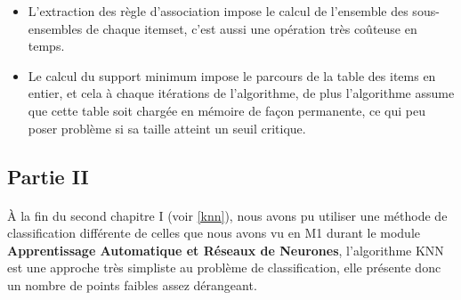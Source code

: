 \documentclass[12pt]{report}
\begin{document}
\begin{itemize}
\begin{itemize}
					\item L'extraction des règle d'association impose le calcul de l'ensemble des sous-ensembles de chaque itemset, c'est aussi une opération très coûteuse en temps.
					\item Le calcul du support minimum impose le parcours de la table des items en entier, et cela à chaque itérations de l'algorithme, de plus l'algorithme assume que cette table soit chargée en mémoire de façon permanente, ce qui peu poser problème si sa taille atteint un seuil critique.
				\end{itemize} 
		\end{itemize}
		\subsection{Partie II}
			\paragraph{}
			À la fin du second chapitre I (voir \ref{knn}), nous avons pu utiliser une méthode de classification différente de celles que nous avons vu en M1 durant le module \textbf{Apprentissage Automatique et Réseaux de Neurones}, l'algorithme KNN est une approche très simpliste au problème de classification, elle présente donc un nombre de points faibles assez dérangeant.
\end{document}
